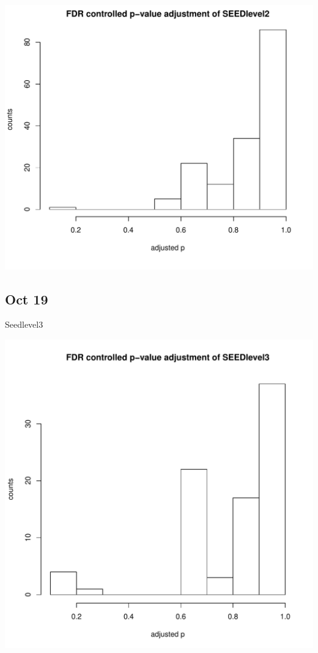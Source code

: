 \documentclass{article}\usepackage[]{graphicx}\usepackage[]{color}
\makeatletter
\def\maxwidth{ %
  \ifdim\Gin@nat@width>\linewidth
    \linewidth
  \else
    \Gin@nat@width
  \fi
}
\makeatother
\begin{document}
\begin{Schunk}
{\centering \includegraphics[width=\maxwidth]{figure/Oct_15_1-5} 

}

\end{Schunk}


  \subsection{Oct 19}
   Seedlevel3
\begin{Schunk}


{\centering \includegraphics[width=\maxwidth]{figure/Oct_19_Seed-1} 

}

\end{Schunk}
\end{document}
